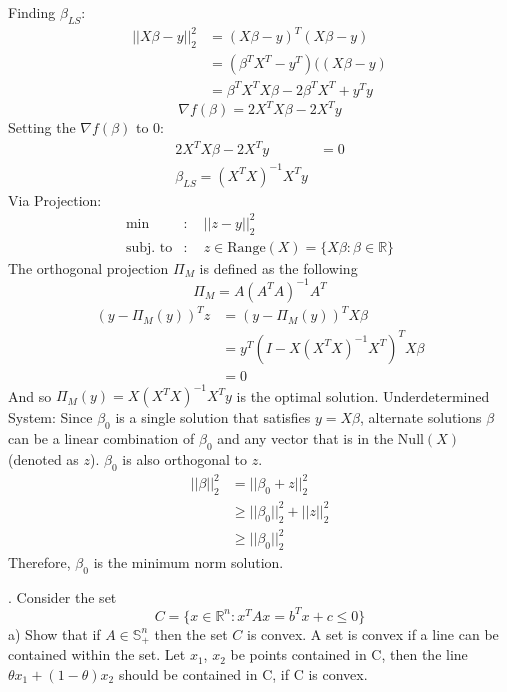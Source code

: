 \documentclass{article}
\begin{document}
\newpage
\noindent
Finding $\beta_{LS}$:
\begin{align*}
	||X\beta - y||^2_2 &= (X\beta - y)^T(X\beta-y) \\
	&= (\beta^TX^T - y^T)((X\beta-y) \\
	&= \beta^TX^TX\beta - 2\beta^TX^T + y^Ty
\end{align*}
\begin{equation*}
	\nabla f(\beta) = 2X^TX\beta - 2X^Ty
\end{equation*}
Setting the $\nabla f(\beta)$ to $0$:
\begin{align*}
	2X^TX\beta - 2X^Ty &= 0 \\
	\beta_{LS} = (X^TX)^{-1}X^Ty
\end{align*}
Via Projection:
\begin{align*}
	\text{min} &: \quad||z - y||^2_2 \\
	\text{subj. to} &: \quad z \in \text{Range}(X) = \{ X\beta : \beta \in \mathbb{R} \}
\end{align*}
The orthogonal projection $\Pi_M$ is defined as the following
\begin{equation*}
	\Pi_M = A(A^TA)^{-1}A^T
\end{equation*}
\begin{align*}
	(y - \Pi_M(y) )^Tz &= (y - \Pi_M(y) )^TX\beta \\
	&= y^T(I - X(X^TX)^{-1}X^T)^TX\beta \\
	&= 0
\end{align*}
And so $\Pi_M(y) = X(X^TX)^{-1}X^Ty $ is the optimal solution. 
\newpage
\noindent
Underdetermined System:
Since $\beta_0$ is a single solution that satisfies $y = X\beta$, alternate solutions $\beta$ can be a linear combination of $\beta_0$ and any vector that is in the $\text{Null}(X)$ (denoted as $z$). $\beta_0$ is also orthogonal to $z$. 
\begin{align*}
	||\beta||^2_2 &= ||\beta_0 + z||^2_2 \\
	&\geq ||\beta_0||^2_2 + ||z||^2_2 \\
	& \geq ||\beta_0||^2_2
\end{align*}
Therefore, $\beta_0$ is the minimum norm solution. \par
\newpage
{}. Consider the set
\begin{equation}
	C = \{ x \in \mathbb{R}^n : x^TAx = b^Tx + c \leq 0 \}
\end{equation}
a) Show that if $A \in \mathbb{S}^n_+$ then the set $C$ is convex.
A set is convex if a line can be contained within the set. 
Let $x_1$, $x_2$ be points contained in C, then the line $\theta x_1 + (1-\theta) x_2$ should be contained in C, if C is convex.
\end{document}
